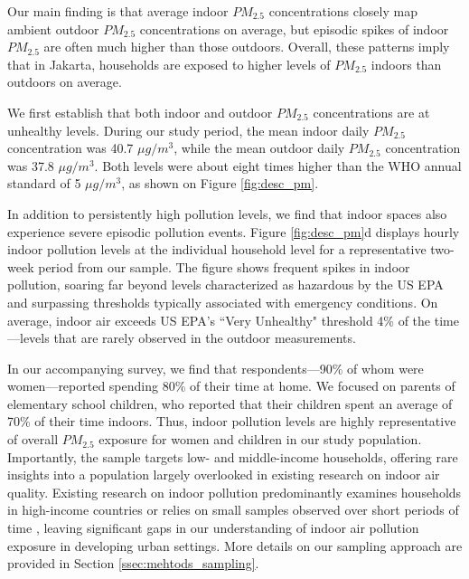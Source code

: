 \documentclass[9pt,twocolumn,twoside]{pnas-new}
\begin{document}
Our main finding is that average indoor $PM_{2.5}$ concentrations closely map ambient outdoor $PM_{2.5}$ concentrations on average, but episodic spikes of indoor $PM_{2.5}$ are often much higher than those outdoors. %
Overall, these patterns imply that in Jakarta, households are exposed to higher levels of $PM_{2.5}$ indoors than outdoors on average.

We first establish that both indoor and outdoor $PM_{2.5}$ concentrations are at unhealthy levels. During our study period, the mean indoor daily $PM_{2.5}$ concentration was 40.7 $\mu g/m^3$, while the mean outdoor daily $PM_{2.5}$ concentration was 37.8 $\mu g/m^3$. Both levels were about eight times higher than the WHO annual standard of 5 $\mu g/m^3$, as shown on Figure \ref{fig:desc_pm}.

In addition to persistently high pollution levels, we find that indoor spaces also experience severe episodic pollution events. Figure \ref{fig:desc_pm}d displays hourly indoor pollution levels at the individual household level for a representative two-week period from our sample. The figure shows frequent spikes in indoor pollution, soaring far beyond levels characterized as hazardous by the US EPA and surpassing thresholds typically associated with emergency conditions. On average, indoor air exceeds US EPA's ``Very Unhealthy" threshold 4\% of the time—levels that are rarely observed in the outdoor measurements. 


In our accompanying survey, we find that respondents—90\% of whom were women—reported spending 80\% of their time at home. We focused on parents of elementary school children, who reported that their children spent an average of 70\% of their time indoors. Thus, indoor pollution levels are highly representative of overall $PM_{2.5}$ exposure for women and children in our study population. Importantly, the sample targets low- and middle-income households, offering rare insights into a population largely overlooked in existing research on indoor air quality. Existing research on indoor pollution predominantly examines households in high-income countries \citep{krebs_using_2021, lunderberg_assessing_2023, burke_exposures_2022} or relies on small samples observed over short periods of time \citep{lim_comparing_2022}, leaving significant gaps in our understanding of indoor air pollution exposure in developing urban settings. More details on our sampling approach are provided in Section \ref{ssec:mehtods_sampling}.
\end{document}
